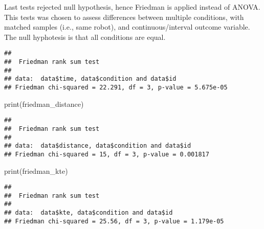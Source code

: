 \documentclass[
]{article}
\newenvironment{Shaded}{\begin{snugshade}}{\end{snugshade}}
\newcommand{\FunctionTok}[1]{\textcolor[rgb]{0.00,0.00,0.00}{#1}}
\newcommand{\NormalTok}[1]{#1}
\newcommand{\OtherTok}[1]{\textcolor[rgb]{0.56,0.35,0.01}{#1}}
\newcommand{\SpecialCharTok}[1]{\textcolor[rgb]{0.00,0.00,0.00}{#1}}
\begin{document}
Last tests rejected null hypothesis, hence Friedman is applied instead
of ANOVA. This tests was chosen to assess differences between multiple
conditions, with matched samples (i.e., same robot), and
continuous/interval outcome variable. The null hyphotesis is that all
conditions are equal.

\begin{Shaded}
\end{Shaded}

\begin{verbatim}
## 
##  Friedman rank sum test
## 
## data:  data$time, data$condition and data$id
## Friedman chi-squared = 22.291, df = 3, p-value = 5.675e-05
\end{verbatim}

\begin{Shaded}
\begin{Highlighting}[]
\FunctionTok{print}\NormalTok{(friedman\_distance)}
\end{Highlighting}
\end{Shaded}

\begin{verbatim}
## 
##  Friedman rank sum test
## 
## data:  data$distance, data$condition and data$id
## Friedman chi-squared = 15, df = 3, p-value = 0.001817
\end{verbatim}

\begin{Shaded}
\begin{Highlighting}[]
\FunctionTok{print}\NormalTok{(friedman\_kte)}
\end{Highlighting}
\end{Shaded}

\begin{verbatim}
## 
##  Friedman rank sum test
## 
## data:  data$kte, data$condition and data$id
## Friedman chi-squared = 25.56, df = 3, p-value = 1.179e-05
\end{verbatim}
\end{document}
